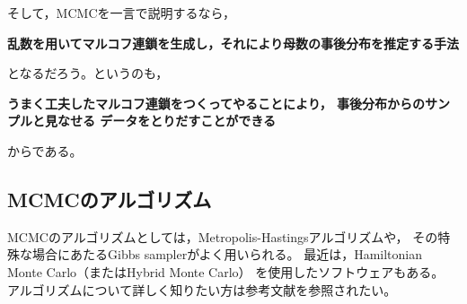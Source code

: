 \documentclass[11pt,uplatex]{jsarticle}
\begin{document}
そして，MCMCを一言で説明するなら，

\vspace{2zw}
\hspace{10mm}
\begin{minipage}{110mm}
\begin{breakbox}
\noindent
{\large\bf 乱数を用いてマルコフ連鎖を生成し，それにより母数の事後分布を推定する手法}
\end{breakbox}
\end{minipage}
\vspace{2zw}

\noindent
となるだろう。というのも，

\vspace{2zw}
\hspace{10mm}
\begin{minipage}{110mm}
\begin{breakbox}
\noindent
{\large\bf うまく工夫したマルコフ連鎖をつくってやることにより，
事後分布からのサンプルと見なせる
データをとりだすことができる}
\end{breakbox}
\end{minipage}
\vspace{2zw}

\noindent
からである。


\subsection{MCMCのアルゴリズム}

MCMCのアルゴリズムとしては，Metropolis-Hastingsアルゴリズムや，
その特殊な場合にあたるGibbs samplerがよく用いられる。\cite{PRML,Iba2005,Toyoda,Watanabe}
最近は，Hamiltonian Monte Carlo（またはHybrid Monte Carlo）
\cite{PRML,BDA3,Toyoda2015,Watanabe}
を使用したソフトウェアもある。
アルゴリズムについて詳しく知りたい方は参考文献を参照されたい。
\end{document}

